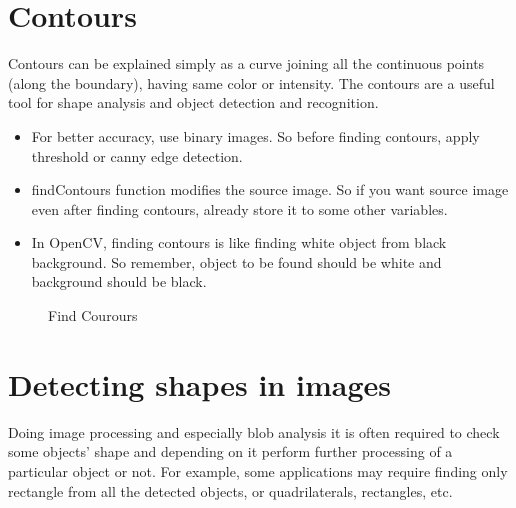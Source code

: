 \section{Contours}
Contours can be explained simply as a curve joining all the continuous points (along the boundary), having same color or intensity. The contours are a useful tool for shape analysis and object detection and recognition. \cite{Contours}
\begin{itemize}
\item For better accuracy, use binary images. So before finding contours, apply threshold or canny edge detection.
\item findContours function modifies the source image. So if you want source image even after finding contours, already store it to some other variables.
\item In OpenCV, finding contours is like finding white object from black background. So remember, object to be found should be white and background should be black.
\end{itemize}
\begin{figure}[H]
\centering
{}
\caption {Find Courours}
\label {fig:Amino_Acid}
\end{figure}
\section{Detecting shapes in images}
\label{Shape}
Doing image processing and especially blob analysis it is often required to check some objects' shape and depending on it perform further processing of a particular object or not. For example, some applications may require finding only rectangle from all the detected objects, or quadrilaterals, rectangles, etc. \cite{DetectingShape}
